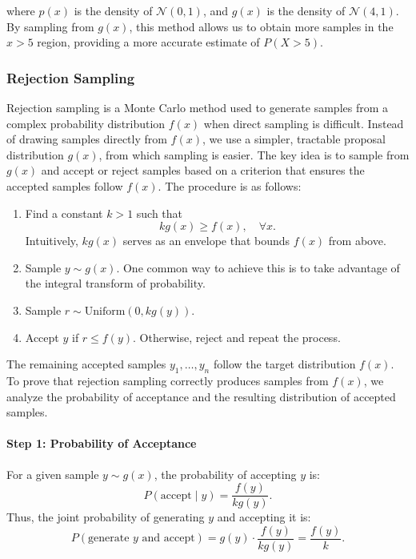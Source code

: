         where \( p(x) \) is the density of \( \mathcal{N}(0,1) \), and \( g(x) \) is the density of \( \mathcal{N}(4,1) \). By sampling from \( g(x) \), this method allows us to obtain more samples in the \( x > 5 \) region, providing a more accurate estimate of \( P(X > 5) \).


\subsubsection{Rejection Sampling}

Rejection sampling is a Monte Carlo method used to generate samples from a complex probability distribution \( f(x) \) when direct sampling is difficult. Instead of drawing samples directly from \( f(x) \), we use a simpler, tractable proposal distribution \( g(x) \), from which sampling is easier. The key idea is to sample from \( g(x) \) and accept or reject samples based on a criterion that ensures the accepted samples follow \( f(x) \). The procedure is as follows:

\begin{enumerate}
    \item Find a constant \( k > 1 \) such that 
    \[
    k g(x) \geq f(x), \quad \forall x.
    \]
    Intuitively, \( k g(x) \) serves as an envelope that bounds \( f(x) \) from above.
    
    \item Sample \( y \sim g(x) \). One common way to achieve this is to take advantage of the integral transform of probability.
    
    \item Sample \( r \sim \text{Uniform}(0, k g(y)) \).
    
    \item Accept \( y \) if \( r \leq f(y) \). Otherwise, reject and repeat the process.
\end{enumerate}

The remaining accepted samples \( y_1, \ldots, y_n \) follow the target distribution \( f(x) \).
To prove that rejection sampling correctly produces samples from \( f(x) \), we analyze the probability of acceptance and the resulting distribution of accepted samples.

\paragraph{Step 1: Probability of Acceptance}
For a given sample \( y \sim g(x) \), the probability of accepting \( y \) is:
\[
P(\text{accept} \mid y) = \frac{f(y)}{k g(y)}.
\]
Thus, the joint probability of generating \( y \) and accepting it is:
\[
P(\text{generate } y \text{ and accept}) = g(y) \cdot \frac{f(y)}{k g(y)} = \frac{f(y)}{k}.
\]
